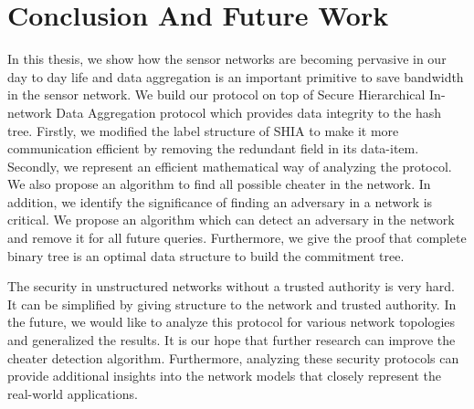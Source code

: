 \chapter{Conclusion And Future Work} 
\label{cha:conclusion}

	In this thesis, we show how the sensor networks are becoming pervasive in our day to day life
	and data aggregation is an important primitive to save bandwidth in the sensor network.
	We build our protocol on top of Secure Hierarchical In-network Data Aggregation protocol which provides data integrity to the hash tree.
	Firstly, we modified the label structure of SHIA to make it more communication efficient by removing the redundant field in its data-item.
	Secondly, we represent an efficient mathematical way of analyzing the protocol. 
	We also propose an algorithm to find all possible cheater in the network.
	In addition, we identify the significance of finding an adversary in a network is critical. 
	We propose an algorithm which can detect an adversary in the network and remove it for all future queries.
	Furthermore, we give the proof that complete binary tree is an optimal data structure to build the commitment tree.

	The security in unstructured networks without a trusted authority is very hard.
	It can be simplified by giving structure to the network and trusted authority.
	In the future, we would like to analyze this protocol for various network topologies and generalized the results.
	It is our hope that further research can improve the cheater detection algorithm.
	Furthermore, analyzing these security protocols can provide additional insights into the network models that closely represent the real-world applications.  